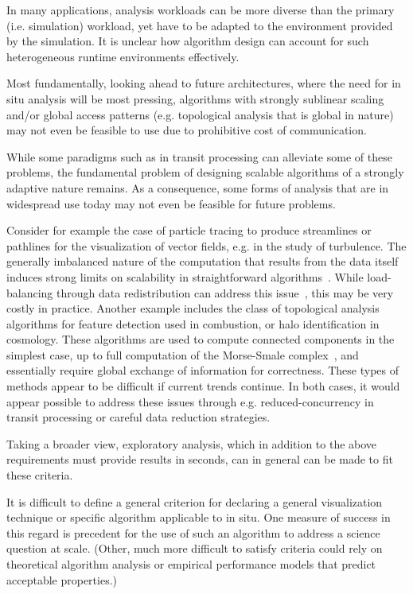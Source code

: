 \begin{refsection}
In many applications, analysis workloads can be more diverse than the primary (i.e. simulation) workload, yet have to be adapted to the environment provided by the simulation. It is unclear how algorithm design can account for such heterogeneous runtime environments effectively.

Most fundamentally, looking ahead to future architectures, where the need for in situ analysis will be most pressing, algorithms with strongly sublinear scaling and/or global access patterns (e.g. topological analysis that is global in nature) may not even be feasible to use due to prohibitive cost of communication. 

While some paradigms such as in transit processing can alleviate some of these problems, the fundamental problem of designing scalable algorithms of a strongly adaptive nature remains. As a consequence, some forms of analysis that are in widespread use today may not even be feasible for future problems.

Consider for example the case of particle tracing to produce streamlines or pathlines for the visualization of vector fields, e.g. in the study of turbulence. The generally imbalanced nature of the computation that results from the data itself induces strong limits on scalability in straightforward algorithms~\cite{Pugmire09}. While load-balancing through data redistribution can address this issue~\cite{Nouanesengsy11}, this may be very costly in practice. Another example includes the class of topological analysis algorithms for feature detection used in combustion, or halo identification in cosmology. These algorithms are used to compute connected components in the simplest case, up to full computation of the Morse-Smale complex~\cite{gyulassy2008practical}, and essentially require global exchange of information for correctness. These types of methods appear to be difficult if current trends continue. In both cases, it would appear possible to address these issues through e.g. reduced-concurrency in transit processing or careful data reduction strategies.

Taking a broader view, exploratory analysis, which in addition to the above requirements must provide results in seconds, can in general can be made to fit these criteria.

It is difficult to define a general criterion for declaring a general visualization technique or specific algorithm applicable to  in situ. One measure of success in this regard is precedent for the use of such an algorithm to address a science question at scale. (Other, much more difficult to satisfy criteria could rely on theoretical algorithm analysis or empirical performance models that predict acceptable properties.)


\end{refsection}
